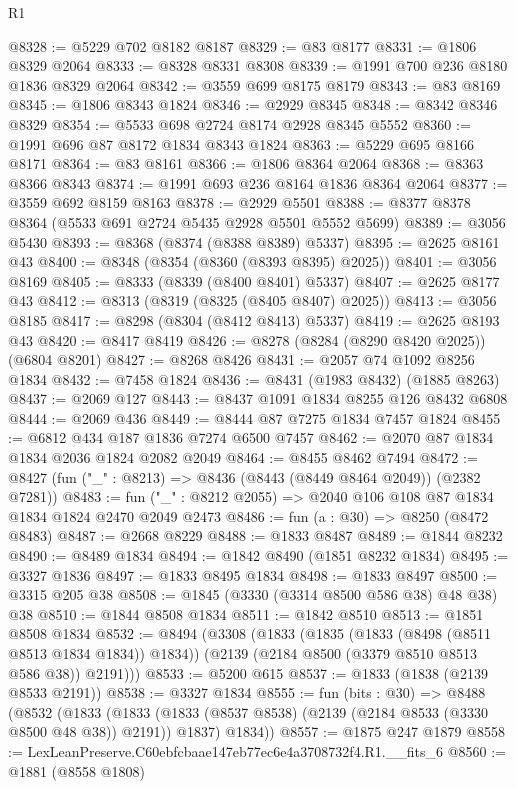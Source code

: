 \begin{lexlean}{R1}
\begin{coremodule}
@8328 := @5229 @702 @8182 @8187
@8329 := @83 @8177
@8331 := @1806 @8329 @2064
@8333 := @8328 @8331 @8308
@8339 := @1991 @700 @236 @8180 @1836 @8329 @2064
@8342 := @3559 @699 @8175 @8179
@8343 := @83 @8169
@8345 := @1806 @8343 @1824
@8346 := @2929 @8345
@8348 := @8342 @8346 @8329
@8354 := @5533 @698 @2724 @8174 @2928 @8345 @5552
@8360 := @1991 @696 @87 @8172 @1834 @8343 @1824
@8363 := @5229 @695 @8166 @8171
@8364 := @83 @8161
@8366 := @1806 @8364 @2064
@8368 := @8363 @8366 @8343
@8374 := @1991 @693 @236 @8164 @1836 @8364 @2064
@8377 := @3559 @692 @8159 @8163
@8378 := @2929 @5501
@8388 := @8377 @8378 @8364 (@5533 @691 @2724 @5435 @2928 @5501 @5552 @5699)
@8389 := @3056 @5430
@8393 := @8368 (@8374 (@8388 @8389) @5337)
@8395 := @2625 @8161 @43
@8400 := @8348 (@8354 (@8360 (@8393 @8395) @2025))
@8401 := @3056 @8169
@8405 := @8333 (@8339 (@8400 @8401) @5337)
@8407 := @2625 @8177 @43
@8412 := @8313 (@8319 (@8325 (@8405 @8407) @2025))
@8413 := @3056 @8185
@8417 := @8298 (@8304 (@8412 @8413) @5337)
@8419 := @2625 @8193 @43
@8420 := @8417 @8419
@8426 := @8278 (@8284 (@8290 @8420 @2025)) (@6804 @8201)
@8427 := @8268 @8426
@8431 := @2057 @74 @1092 @8256 @1834
@8432 := @7458 @1824
@8436 := @8431 (@1983 @8432) (@1885 @8263)
@8437 := @2069 @127
@8443 := @8437 @1091 @1834 @8255 @126 @8432 @6808
@8444 := @2069 @436
@8449 := @8444 @87 @7275 @1834 @7457 @1824
@8455 := @6812 @434 @187 @1836 @7274 @6500 @7457
@8462 := @2070 @87 @1834 @1834 @2036 @1824 @2082 @2049
@8464 := @8455 @8462 @7494
@8472 := @8427 (fun ("_" : @8213) => @8436 (@8443 (@8449 @8464 @2049)) (@2382 @7281))
@8483 := fun ("_" : @8212 @2055) => @2040 @106 @108 @87 @1834 @1834 @1824 @2470 @2049 @2473
@8486 := fun (a : @30) => @8250 (@8472 @8483)
@8487 := @2668 @8229
@8488 := @1833 @8487
@8489 := @1844 @8232
@8490 := @8489 @1834
@8494 := @1842 @8490 (@1851 @8232 @1834)
@8495 := @3327 @1836
@8497 := @1833 @8495 @1834
@8498 := @1833 @8497
@8500 := @3315 @205 @38
@8508 := @1845 (@3330 (@3314 @8500 @586 @38) @48 @38) @38
@8510 := @1844 @8508 @1834
@8511 := @1842 @8510
@8513 := @1851 @8508 @1834
@8532 := @8494
    (@3308
      (@1833
        (@1835 (@1833 (@8498 (@8511 @8513 @1834 @1834)) @1834))
        (@2139 (@2184 @8500 (@3379 @8510 @8513 @586 @38)) @2191)))
@8533 := @5200 @615
@8537 := @1833 (@1838 (@2139 @8533 @2191))
@8538 := @3327 @1834
@8555 := fun (bits : @30) =>
  @8488
    (@8532
      (@1833
        (@1833 (@1833 (@8537 @8538) (@2139 (@2184 @8533 (@3330 @8500 @48 @38)) @2191)) @1837)
        @1834))
@8557 := @1875 @247 @1879
@8558 := LexLeanPreserve.C60ebfcbaae147eb77ec6e4a3708732f4.R1.__fits_6
@8560 := @1881 (@8558 @1808)

\end{coremodule}
\end{lexlean}
